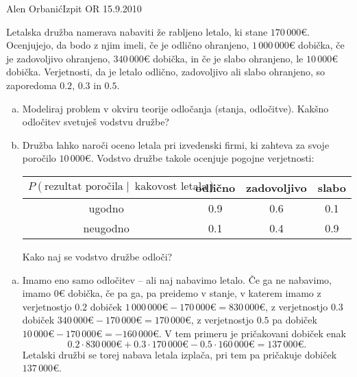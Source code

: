 \begin{naloga}{Alen Orbanić}{Izpit OR 15.9.2010}
\begin{vprasanje}
Letalska družba namerava nabaviti že rabljeno letalo, ki stane $170\,000 €$.
Ocenjujejo, da bodo z njim imeli,
če je odlično ohranjeno, $1\,000\,000 €$ dobička,
če je zadovoljivo ohranjeno, $340\,000 €$ dobička,
in če je slabo ohranjeno, le $10\,000 €$ dobička.
Verjetnosti, da je letalo odlično, zadovoljivo ali slabo ohranjeno,
so zaporedoma $0.2$, $0.3$ in $0.5$.
\begin{enumerate}[(a)]
\item Modeliraj problem v okviru teorije odločanja (stanja, odločitve).
Kakšno odločitev svetuješ vodstvu družbe?

\item Družba lahko naroči oceno letala pri izvedenski firmi,
ki zahteva za svoje poročilo $10\,000 €$.
Vodstvo družbe takole ocenjuje pogojne verjetnosti:
\begin{center}
\begin{tabular}{c|ccc}
$P(\text{rezultat poročila} \;|\;\ \text{kakovost letala})$
& odlično & zadovoljivo & slabo \\ \hline
ugodno & 0.9 & 0.6 & 0.1 \\
neugodno & 0.1 & 0.4 & 0.9
\end{tabular}
\end{center}
Kako naj se vodstvo družbe odloči?
\end{enumerate}
\end{vprasanje}

\begin{odgovor}
\begin{enumerate}[(a)]
\item Imamo eno samo odločitev -- ali naj nabavimo letalo.
Če ga ne nabavimo, imamo $0 €$ dobička,
če pa ga, pa preidemo v stanje,
v katerem imamo z verjetnostjo $0.2$
dobiček $1\,000\,000 € - 170\,000 € = 830\,000 €$,
z verjetnostjo $0.3$ dobiček $340\,000 € - 170\,000 € = 170\,000 €$,
z verjetnostjo $0.5$ pa dobiček $10\,000 € - 170\,000 € = -160\,000 €$.
V tem primeru je pričakovani dobiček enak
$$
0.2 \cdot 830\,000 € + 0.3 \cdot 170\,000 € - 0.5 \cdot 160\,000 €
= 137\,000 € .
$$
Letalski družbi se torej nabava letala izplača,
pri tem pa pričakuje dobiček $137\,000 €$.


\end{enumerate}
\end{odgovor}
\end{naloga}
